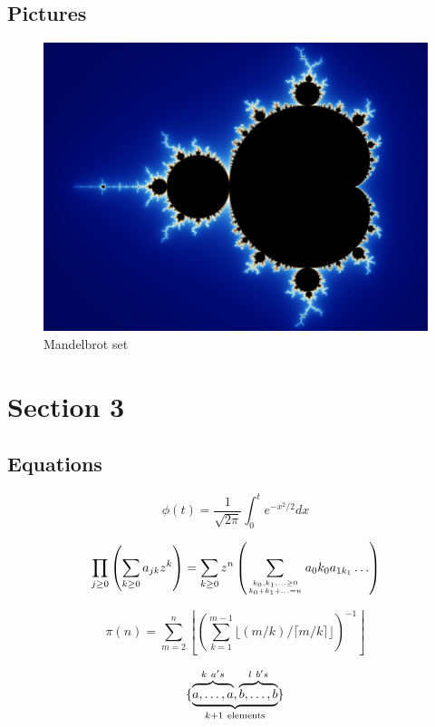 \documentclass[a4paper,12pt,hidelinks]{article}
\begin{document}
	\subsection{Pictures}
	\begin{figure}[H]
		\centering
		\includegraphics[width=12cm]{figs/mandelbrotset.jpg}
		\caption{Mandelbrot set}
		\label{fig:mandelbrotset}
	\end{figure} 

	\pagebreak

\section{Section 3}
	\subsection{Equations}
	\begin{equation}
		\phi(t)=\frac{1}{\sqrt{2\pi}}
		\int^t_0 e^{-x^2/2} dx 
	\end{equation}

	\begin{equation}
		\prod_{j\geq 0}
		\left(\sum_{k\geq 0}a_{jk} z^k\right) 
		= \sum_{k\geq 0} z^n
		\left( \sum_{{k_0,k_1,\ldots\geq 0}
		\atop{k_0+k_1+\ldots=n}    }
		a{_0k_0}a_{1k_1}\ldots  \right) 
	\end{equation}

	\begin{equation}
		\pi(n) = \sum_{m=2}^{n}
		\left\lfloor \left(\sum_{k=1}^{m-1}
		\lfloor(m/k)/\lceil m/k\rceil 
		\rfloor \right)^{-1}
		\right\rfloor
	\end{equation}

	\begin{equation}
		\{\underbrace{
			\overbrace{\mathstrut a,\ldots,a}^{k\ a's},
			\overbrace{\mathstrut b,\ldots,b}^{l\ b's}}
			_{k+1\ \mathrm{elements}}                   \}
	\end{equation}
\end{document}
